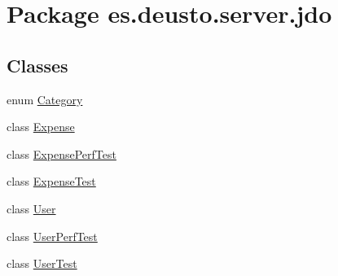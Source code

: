 \hypertarget{namespacees_1_1deusto_1_1server_1_1jdo}{}\section{Package es.\+deusto.\+server.\+jdo}
\label{namespacees_1_1deusto_1_1server_1_1jdo}
\subsection*{Classes}
\begin{DoxyCompactItemize}
\item 
enum \hyperlink{enumes_1_1deusto_1_1server_1_1jdo_1_1_category}{Category}
\item 
class \hyperlink{classes_1_1deusto_1_1server_1_1jdo_1_1_expense}{Expense}
\item 
class \hyperlink{classes_1_1deusto_1_1server_1_1jdo_1_1_expense_perf_test}{Expense\+Perf\+Test}
\item 
class \hyperlink{classes_1_1deusto_1_1server_1_1jdo_1_1_expense_test}{Expense\+Test}
\item 
class \hyperlink{classes_1_1deusto_1_1server_1_1jdo_1_1_user}{User}
\item 
class \hyperlink{classes_1_1deusto_1_1server_1_1jdo_1_1_user_perf_test}{User\+Perf\+Test}
\item 
class \hyperlink{classes_1_1deusto_1_1server_1_1jdo_1_1_user_test}{User\+Test}
\end{DoxyCompactItemize}
